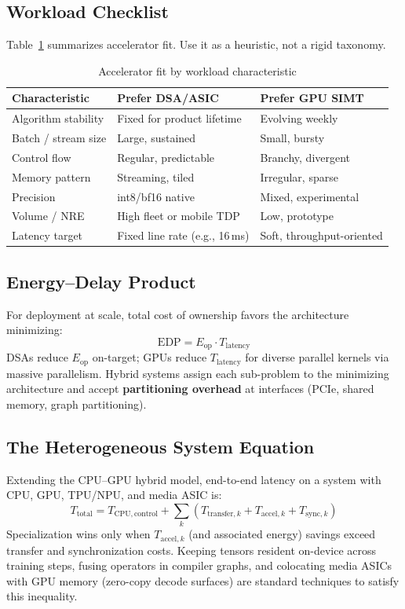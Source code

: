 \documentclass[11pt,journal,onecolumn]{IEEEtran}
\begin{document}
\subsection{Workload Checklist}
Table~\ref{tab:fit} summarizes accelerator fit. Use it as a heuristic, not a rigid taxonomy.

\begin{table}[h]
\centering
\caption{Accelerator fit by workload characteristic}
\label{tab:fit}
\begin{tabular}{@{}lll@{}}
\toprule
\textbf{Characteristic} & \textbf{Prefer DSA/ASIC} & \textbf{Prefer GPU SIMT} \\
\midrule
Algorithm stability & Fixed for product lifetime & Evolving weekly \\
Batch / stream size & Large, sustained & Small, bursty \\
Control flow & Regular, predictable & Branchy, divergent \\
Memory pattern & Streaming, tiled & Irregular, sparse \\
Precision & int8/bf16 native & Mixed, experimental \\
Volume / NRE & High fleet or mobile TDP & Low, prototype \\
Latency target & Fixed line rate (e.g., 16\,ms) & Soft, throughput-oriented \\
\bottomrule
\end{tabular}
\end{table}

\subsection{Energy--Delay Product}
For deployment at scale, total cost of ownership favors the architecture minimizing:
\begin{equation}
\mathrm{EDP} = E_{\mathrm{op}} \cdot T_{\mathrm{latency}}
\end{equation}
DSAs reduce $E_{\mathrm{op}}$ on-target; GPUs reduce $T_{\mathrm{latency}}$ for diverse parallel kernels via massive parallelism. Hybrid systems assign each sub-problem to the minimizing architecture and accept \textbf{partitioning overhead} at interfaces (PCIe, shared memory, graph partitioning).

\subsection{The Heterogeneous System Equation}
Extending the CPU--GPU hybrid model, end-to-end latency on a system with CPU, GPU, TPU/NPU, and media ASIC is:
\begin{equation}
T_{\mathrm{total}} = T_{\mathrm{CPU,control}} + \sum_k \left( T_{\mathrm{transfer},k} + T_{\mathrm{accel},k} + T_{\mathrm{sync},k} \right)
\end{equation}
Specialization wins only when $T_{\mathrm{accel},k}$ (and associated energy) savings exceed transfer and synchronization costs. Keeping tensors resident on-device across training steps, fusing operators in compiler graphs, and colocating media ASICs with GPU memory (zero-copy decode surfaces) are standard techniques to satisfy this inequality.
\end{document}
